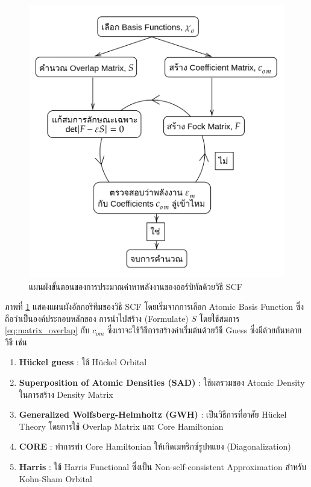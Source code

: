 \begin{figure}[htbp]
    \centering
    \includegraphics[width=0.9\linewidth]{fig/scf.png}
    \caption{แผนผังขั้นตอนของการประมาณค่าหาพลังงานของออร์บิทัลด้วยวิธี SCF}
    \label{fig:scf}
\end{figure}

ภาพที่ \ref{fig:scf} แสดงแผนผังอัลกอริทึมของวิธี SCF โดยเริ่มจากการเลือก Atomic Basis Function ซึ่งถือว่าเป็นองค์ประกอบหลักของ%
การนำไปสร้าง (Formulate) $S$ โดยใช้สมการ \ref{eq:matrix_overlap} กับ $c_{om}$ ซึ่งเราจะใช้วิธีการสร้างค่าเริ่มต้นด้วยวิธี Guess 
ซึ่งมีด้วยกันหลายวิธี เช่น

\begin{enumerate}[topsep=0pt]
    \item \textbf{H{\"u}ckel guess} : ใช้ H{\"u}ckel Orbital\autocite{jensen2017}
    
    \item \textbf{Superposition of Atomic Densities (SAD)} : ใช้ผลรวมของ Atomic Density ในการสร้าง Density Matrix
    
    \item \textbf{Generalized Wolfsberg-Helmholtz (GWH)} : เป็นวิธีการที่อาศัย H{\"u}ckel Theory โดยการใช้ Overlap 
    Matrix และ Core Hamiltonian\autocite{wolfsberg1952}
    
    \item \textbf{CORE} : ทำการทำ Core Hamiltonian ให้เกิดเมทริกซ์รูปทแยง (Diagonalization)
    
    \item \textbf{Harris} : ใช้ Harris Functional ซึ่งเป็น Non-self-consistent Approximation สำหรับ Kohn-Sham 
    Orbital\autocite{harris1985}
\end{enumerate}

